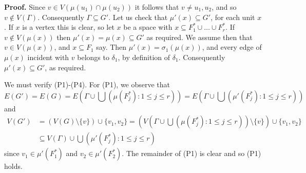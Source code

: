\textbf{Proof.} Since $v \in V(\mu(u_1) \cap \mu(u_2))$ it follows that $v \ne u_1, u_2$, and so $v \notin V(\Gamma)$. Consequently $\Gamma \subseteq G'$. Let us check that $\mu'(x) \subseteq G'$, for each unit $x$. If $x$ is a vertex this is clear, so let $x$ be a space with $x \subseteq F_1^* \cup \dots \cup F_r^*$. If $v \notin V(\mu(x))$ then $\mu'(x) = \mu(x) \subseteq G'$ as required. We assume then that $v \in V(\mu(x))$, and $x \subseteq F_1$ say. Then $\mu'(x) = \sigma_1(\mu(x))$, and every edge of $\mu(x)$ incident with $v$ belongs to $\delta_1$, by definition of $\delta_1$. Consequently $\mu'(x) \subseteq G'$, as required.

We must verify (P1)-(P4). For (P1), we observe that
\begin{equation*}
E(G') = E(G) = E(\Gamma \cup \bigcup(\mu(F_j^*) : 1 \le j \le r)) = E(\Gamma \cup \bigcup(\mu'(F_j^*) : 1 \le j \le r))
\end{equation*}
and
\begin{align*}
V(G') &= (V(G) \setminus \{v\}) \cup \{v_1, v_2\} = (V(\Gamma \cup \bigcup(\mu(F_j^*) : 1 \le j \le r)) \setminus \{v\}) \cup \{v_1, v_2\} \\
&\subseteq V(\Gamma) \cup \bigcup(\mu'(F_j^*) : 1 \le j \le r)
\end{align*}
since $v_1 \in \mu'(F_1^*)$ and $v_2 \in \mu'(F_2^*)$. The remainder of (P1) is clear and so (P1) holds.
